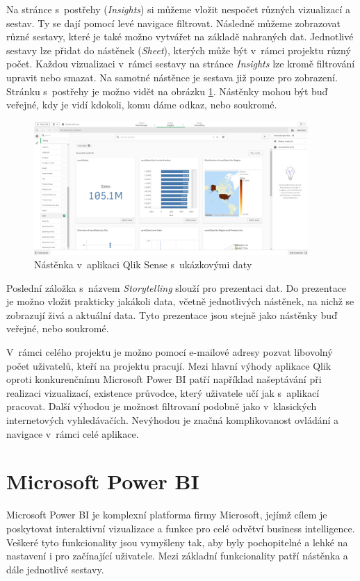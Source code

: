 \documentclass[czech,master]{diploma}
\begin{document}
Na stránce s~postřehy (\textit{Insights})  si můžeme vložit nespočet různých vizualizací a sestav. Ty se dají pomocí levé navigace filtrovat. Následně můžeme zobrazovat různé sestavy, které je také možno vytvářet na základě nahraných dat. Jednotlivé sestavy lze přidat do nástěnek (\textit{Sheet}), kterých může být v~rámci projektu různý počet. Každou vizualizaci v~rámci sestavy na stránce \textit{Insights} lze kromě filtrování upravit nebo smazat. Na samotné nástěnce je sestava již pouze pro zobrazení. Stránku s~postřehy je možno vidět na obrázku \ref{fig:qlik_dashboard}. Nástěnky mohou být buď veřejné, kdy je vidí kdokoli, komu dáme odkaz, nebo soukromé.

\begin{figure}[!ht]
    \centering
    \includegraphics[width=0.93\textwidth]{Diplomka/Figures/qlik_dashboard.png}
    \caption{Nástěnka v~aplikaci Qlik Sense s~ukázkovými daty}
    \label{fig:qlik_dashboard}
\end{figure}

Poslední záložka s~názvem \textit{Storytelling} slouží pro prezentaci dat. Do prezentace je možno vložit prakticky jakákoli data, včetně jednotlivých nástěnek, na nichž se zobrazují živá a aktuální data. Tyto prezentace jsou stejně jako nástěnky buď veřejné, nebo soukromé.

V~rámci celého projektu je možno pomocí e-mailové adresy pozvat libovolný počet uživatelů, kteří na projektu pracují. Mezi hlavní výhody aplikace Qlik oproti konkurenčnímu Microsoft Power BI patří například našeptávání při realizaci vizualizací, existence průvodce, který uživatele učí jak s~aplikací pracovat. Další výhodou je možnost filtrovaní podobně jako v~klasických internetových vyhledávačích. Nevýhodou je značná komplikovanost ovládání a navigace v~rámci celé aplikace.

\section{Microsoft Power BI}
\label{sec:microsoft_power_bi}
Microsoft Power BI je komplexní platforma firmy Microsoft, jejímž cílem je poskytovat interaktivní vizualizace a funkce pro celé odvětví business intelligence. Veškeré tyto funkcionality jsou vymyšleny tak, aby byly pochopitelné a lehké na nastavení i pro začínající uživatele. Mezi základní funkcionality patří nástěnka a dále jednotlivé sestavy.
\end{document}
